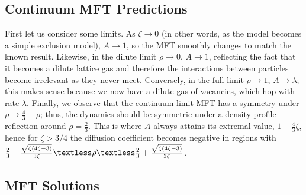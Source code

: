 \subsection{Continuum MFT Predictions}
First let us consider some limits. As $\zeta \rightarrow 0$ (in other words, as the model becomes a simple exclusion model), $A \rightarrow 1$, so the MFT smoothly changes to match the known result. Likewise, in the
dilute limit $\rho \rightarrow 0$, $A \rightarrow 1$, reflecting the fact that it becomes a dilute lattice gas and therefore the interactions between particles become irrelevant as they never meet.
Conversely, in the full limit $\rho \rightarrow 1$, $A \rightarrow \lambda$; this makes sense because we now have a dilute gas of vacancies, which hop with rate $\lambda$.
Finally, we observe that the continuum limit MFT has a symmetry under $\rho \mapsto \frac{4}{3} - \rho$; thus, the dynamics should be symmetric under a density profile reflection around $\rho = \frac{2}{3}$. This is where $A$ always
attains its extremal value, $ 1 - \frac{4}{3}\zeta$, hence for $\zeta>3/4$ the diffusion coefficient becomes negative in regions with
$\frac{2}{3} - \frac{\sqrt{\zeta\left(4\zeta - 3\right)}}{3\zeta} \textless \rho \textless \frac{2}{3} + \frac{\sqrt{\zeta\left(4\zeta - 3\right)}}{3\zeta}$.
\subsection{MFT Solutions}